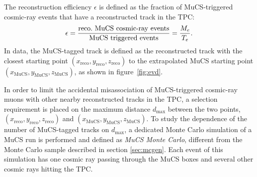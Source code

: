 \documentclass[a4paper,11pt]{article}
\def\myhyphen{{\hbox{-}}}
\begin{document}
The reconstruction efficiency $\epsilon$ is defined as the fraction of MuCS-triggered cosmic-ray events that have a reconstructed track in the TPC:
\begin{equation}\label{eq:eff}
  \epsilon = \frac{\mathrm{reco.~MuCS~cosmic\myhyphen ray~events}}{\mathrm{MuCS~triggered~events}}=\frac{M_{e}}{T_{e}}.
\end{equation}
In data, the MuCS-tagged track is defined as the reconstructed track with the closest starting point $(x_{\mathrm{reco}},y_{\mathrm{reco}},z_{\mathrm{reco}})$ to the extrapolated MuCS starting point $(x_{\mathrm{MuCS}},y_{\mathrm{MuCS}},z_{\mathrm{MuCS}})$, as shown in figure~\ref{fig:evd}. %

In order to limit the accidental misassociation of MuCS-triggered cosmic-ray muons with other nearby reconstructed tracks in the TPC, a selection requirement is placed on the maximum distance $d_{\mathrm{max}}$ between the two points, $(x_{\mathrm{reco}},y_{\mathrm{reco}},z_{\mathrm{reco}})$ and $(x_{\mathrm{MuCS}},y_{\mathrm{MuCS}},z_{\mathrm{MuCS}})$.
To study the dependence of the number of MuCS-tagged tracks on $d_{\mathrm{max}}$, a dedicated Monte Carlo simulation of a MuCS run is performed and defined as \emph{MuCS Monte Carlo}, different from the Monte Carlo sample described in section \ref{sec:mcgen}. Each event of this simulation has one cosmic ray passing through the MuCS boxes and several other cosmic rays hitting the TPC.%
\end{document}
